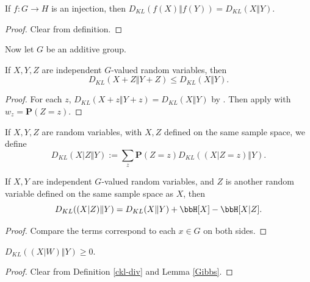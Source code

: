 \begin{lemma}\label{kl-div-inj}\leanok  If $f:G \to H$ is an injection, then $D_{KL}(f(X)\Vert f(Y)) = D_{KL}(X\Vert Y)$.
\end{lemma}

\begin{proof}\leanok{} Clear from definition.
\end{proof}

Now let $G$ be an additive group.

\begin{lemma}\label{kl-sums}\leanok If $X, Y, Z$ are independent $G$-valued random variables, then
  $$D_{KL}(X+Z\Vert Y+Z) \leq D_{KL}(X\Vert Y).$$
\end{lemma}

\begin{proof}\leanok
For each $z$, $D_{KL}(X+z\Vert Y+z)=D_{KL}(X\Vert Y)$ by . Then apply  with $w_z=\mathbf{P}(Z=z)$.
\end{proof}

\begin{definition}\label{ckl-div}  \leanok
  If $X,Y,Z$ are random variables, with $X,Z$ defined on the same sample space, we define
$$ D_{KL}(X|Z \Vert  Y) := \sum_z \mathbf{P}(Z=z) D_{KL}( (X|Z=z) \Vert  Y).$$
\end{definition}

\begin{lemma}\label{kl-cond}\leanok If $X, Y$ are independent $G$-valued random variables, and $Z$ is another random variable defined on the same sample space as $X$, then
  $$D_{KL}((X|Z)\Vert Y) = D_{KL}(X\Vert Y) + \bbH[X] - \bbH[X|Z].$$
\end{lemma}

\begin{proof}\leanok
   Compare the terms correspond to each $x\in G$ on both sides.
\end{proof}

\begin{lemma}\label{Conditional-Gibbs}\leanok  $D_{KL}((X|W)\Vert Y) \geq 0$.
\end{lemma}

\begin{proof}\leanok {}  Clear from Definition \ref{ckl-div} and Lemma \ref{Gibbs}.
\end{proof}

